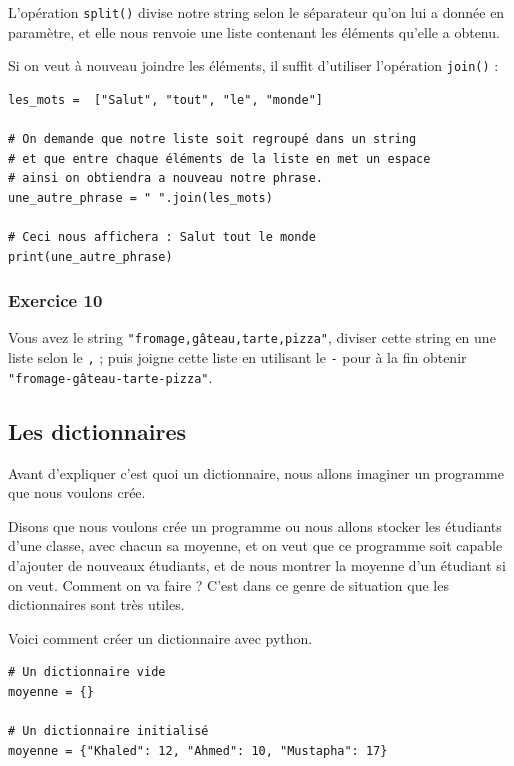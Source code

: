 \documentclass[12pt]{article}
\newcommand{\code}[1]{\colorbox{light-gray}{\texttt{#1}}}
\begin{document}
            L'opération \code{split()} divise notre string selon le séparateur qu'on lui a donnée en paramètre,
            et elle nous renvoie une liste contenant les éléments qu'elle a obtenu.

            Si on veut à nouveau joindre les éléments, il suffit d'utiliser l'opération \code{join()} :
            \begin{lstlisting}[style=code]
les_mots =  ["Salut", "tout", "le", "monde"]

# On demande que notre liste soit regroupé dans un string
# et que entre chaque éléments de la liste en met un espace
# ainsi on obtiendra a nouveau notre phrase.
une_autre_phrase = " ".join(les_mots)

# Ceci nous affichera : Salut tout le monde
print(une_autre_phrase)
            \end{lstlisting}

            \subsubsection{Exercice 10}
                Vous avez le string \code{"fromage,gâteau,tarte,pizza"}, diviser cette string en une liste selon le
                \code{,} ; puis joigne cette liste en utilisant le \code{-} pour à la fin obtenir
                \code{"fromage-gâteau-tarte-pizza"}.

        \subsection{Les dictionnaires}
        Avant d'expliquer c'est quoi un dictionnaire, nous allons imaginer un programme que nous
        voulons crée. 

        Disons que nous voulons crée un programme ou nous allons stocker 
        les étudiants d'une classe, avec chacun sa moyenne, et on veut que ce programme soit capable
        d'ajouter de nouveaux étudiants, et de nous montrer la moyenne d'un étudiant si on veut. 
        Comment on va faire ? C'est dans ce genre de situation que les dictionnaires sont très
        utiles.

        Voici comment créer un dictionnaire avec python.
            \begin{lstlisting}[style=code]
# Un dictionnaire vide
moyenne = {}

# Un dictionnaire initialisé
moyenne = {"Khaled": 12, "Ahmed": 10, "Mustapha": 17}
            \end{lstlisting}       
\end{document}
